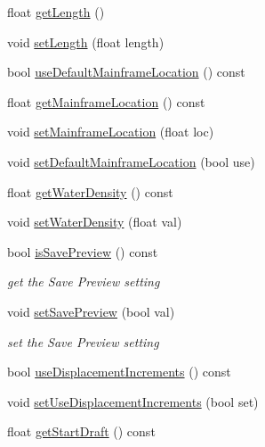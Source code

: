 \begin{DoxyCompactItemize}
\item 
float \hyperlink{classShipCAD_1_1ProjectSettings_a989e357d35af68ac2da9b0e760926308}{get\+Length} ()
\item 
void \hyperlink{classShipCAD_1_1ProjectSettings_aad72cb11575e7a1ae0cda2c50f8de2ad}{set\+Length} (float length)
\item 
bool \hyperlink{classShipCAD_1_1ProjectSettings_adddd4471a30e16aa3aca62bb8bee3b02}{use\+Default\+Mainframe\+Location} () const 
\item 
float \hyperlink{classShipCAD_1_1ProjectSettings_a194fe12f81ed80e691e8a89c88d91a0b}{get\+Mainframe\+Location} () const 
\item 
void \hyperlink{classShipCAD_1_1ProjectSettings_acac72dbc1dc2f68c1d32981ac9a27603}{set\+Mainframe\+Location} (float loc)
\item 
void \hyperlink{classShipCAD_1_1ProjectSettings_a938807868114997fb8f1fadadd026c9b}{set\+Default\+Mainframe\+Location} (bool use)
\item 
float \hyperlink{classShipCAD_1_1ProjectSettings_ad6289f32228b3a33c2c30db45339c438}{get\+Water\+Density} () const 
\item 
void \hyperlink{classShipCAD_1_1ProjectSettings_af4de74cc452581cf8f7e02431ba3e45a}{set\+Water\+Density} (float val)
\item 
bool \hyperlink{classShipCAD_1_1ProjectSettings_a8dc00d3f4528d369dbe5810382a98186}{is\+Save\+Preview} () const 
\begin{DoxyCompactList}\small\item\em get the Save Preview setting \end{DoxyCompactList}\item 
void \hyperlink{classShipCAD_1_1ProjectSettings_a3590a9b52236a4aeb9991ea03c518871}{set\+Save\+Preview} (bool val)
\begin{DoxyCompactList}\small\item\em set the Save Preview setting \end{DoxyCompactList}\item 
bool \hyperlink{classShipCAD_1_1ProjectSettings_a1741d5adba05a97a646849571dc191c2}{use\+Displacement\+Increments} () const 
\item 
void \hyperlink{classShipCAD_1_1ProjectSettings_a42d78c8be073b783cfd953f860cb075b}{set\+Use\+Displacement\+Increments} (bool set)
\item 
float \hyperlink{classShipCAD_1_1ProjectSettings_a9dd72d481ea53fc1a40f74e69ddf364c}{get\+Start\+Draft} () const 
\item 

\end{DoxyCompactItemize}
